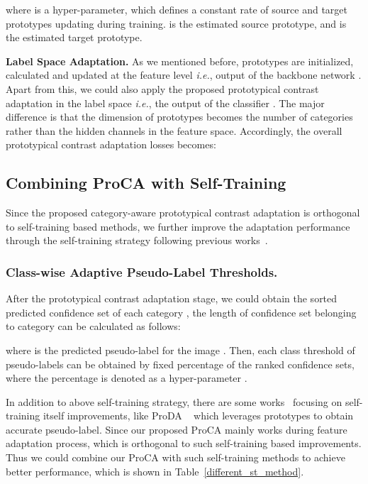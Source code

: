 \documentclass[runningheads]{llncs}
\begin{document}
where  is a hyper-parameter, which defines a constant rate of source and target prototypes updating during training.  is the estimated source prototype, and  is the estimated target prototype.

\noindent \textbf{Label Space Adaptation.} 
As we mentioned before, prototypes are initialized, calculated and updated at the feature level \emph{i.e.}, output of the backbone network . Apart from this, we could also apply the proposed prototypical contrast adaptation in the label space \emph{i.e.}, the output of the classifier . The major difference is that the dimension of prototypes becomes the number of categories rather than the hidden channels in the feature space. Accordingly, the overall prototypical contrast adaptation losses becomes:




\subsection{Combining ProCA with Self-Training}
\label{st}
Since the proposed category-aware prototypical contrast adaptation is orthogonal to self-training based methods, we further improve the adaptation performance through the self-training strategy following previous works~\cite{mei2020instance, li2021semantic}. 

\subsubsection{Class-wise Adaptive Pseudo-Label Thresholds.} After the prototypical contrast adaptation stage, we could obtain the sorted predicted confidence set  of each category , the length of confidence set belonging to category  can be calculated as follows:

where  is the predicted pseudo-label for the image . Then, each class threshold of pseudo-labels can be obtained by fixed percentage of the ranked confidence sets, where the percentage is denoted as a hyper-parameter .

In addition to above self-training strategy, there are some works~\cite{zhang2021prototypical,zheng2021rectifying,mei2020instance} focusing on self-training itself improvements, like ProDA ~\cite{zhang2021prototypical} which leverages prototypes to obtain accurate pseudo-label. Since our proposed ProCA mainly works during feature adaptation process, which is orthogonal to such self-training based improvements. Thus we could combine our ProCA with such self-training methods to achieve better performance, which is shown in Table~\ref{different_st_method}.
\end{document}
